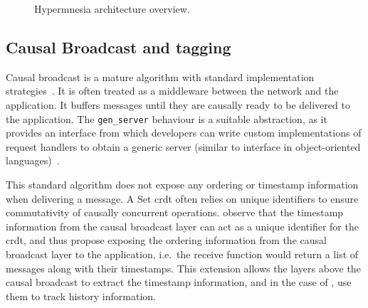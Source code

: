 \begin{figure*}[htp]
  \caption{Hypermnesia architecture overview.}
  \label{fig:hypermnesia arch}
\end{figure*}


\subsection{Causal Broadcast and tagging} \label{subsec:impl cbcast}

Causal broadcast is a mature algorithm with standard implementation 
strategies~\cite{schmuck1988broadcast,birman1991causal}. 
It is often treated as a middleware between the
network and the application. It buffers messages until they are causally ready
to be delivered to the application. The \texttt{gen_server} behaviour
is a suitable abstraction, as it provides an interface from which
developers can write custom implementations of request handlers to obtain a
generic server (similar to interface in object-oriented 
languages)~\cite{ericssonab2023otpdesign}.

This standard algorithm does not expose any ordering or timestamp information when 
delivering a message.
A Set \acrshort{crdt} often relies on unique identifiers to
ensure commutativity of causally concurrent operations. \citet{baquero2017PureOp}
observe that the timestamp information from the causal broadcast layer can act
as a unique identifier for the \acrshort{crdt}, and thus
propose exposing the ordering information from the causal broadcast layer to
the application, i.e.\ the receive function would return a list of messages
along with their timestamps. This extension allows the
layers above the causal broadcast to extract the timestamp information, and in
the case of , use them to track history information.

